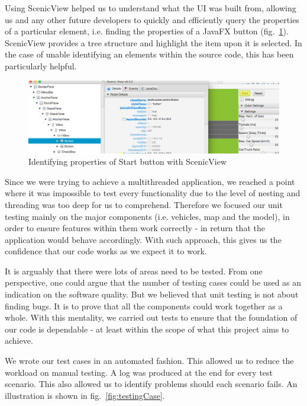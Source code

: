 Using ScenicView helped us to understand what the UI was built from, allowing us and any other future developers to quickly and efficiently query the properties of a particular element, i.e. finding the properties of a JavaFX button (fig.~\ref{fig:scenicview}). ScenicView provides a tree structure and highlight the item upon it is selected. In the case of unable identifying an elements within the source code, this has been particularly helpful.  
\begin{figure}[h]
	\begin{center}
		\includegraphics[width=\textwidth]{img/scenicView.png}
		\caption[Identifying properties of Start button with ScenicView]{Identifying properties of Start button with ScenicView}
		\label{fig:scenicview}
	\end{center}
\end{figure}

Since we were trying to achieve a multithreaded application, we reached a point where it was impossible to test every functionality due to the level of nesting and threading was too deep for us to comprehend. Therefore we focused our unit testing mainly on the major components (i.e. vehicles, map and the model), in order to ensure features within them work correctly - in return that the application would behave accordingly. With such approach, this gives us the confidence that our code works as we expect it to work. 

It is arguably that there were lots of areas need to be tested. From one perspective, one could argue that the number of testing cases could be used as an indication on the software quality. But we believed that unit testing is not about finding bugs. It is to prove that all the components could work together as a whole.  With this mentality, we carried out tests to ensure that the foundation of our code is dependable - at least within the scope of what this project aims to achieve.  

We wrote our test cases in an automated fashion. This allowed us to reduce the workload on manual testing.  A log was produced at the end for every test scenario. This also allowed us to identify problems should each scenario fails. An illustration is shown in fig.~\ref{fig:testingCase}. 

